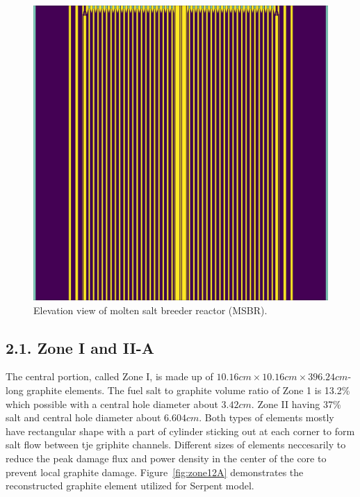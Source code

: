 \documentclass{anstrans}
\begin{document}
\begin{figure}[ht] %
  \centering
  \includegraphics[width=\linewidth]{figure_2_2.png}
  \caption{Elevation view of molten salt breeder reactor (MSBR).}
  \label{fig:elevation}
\end{figure}

\subsection{2.1. Zone I and II-A}
The central portion, called Zone I, is made up of $10.16cm\times10.16cm\times396.24cm$-long graphite elements. The fuel salt to graphite volume ratio of Zone 1 is 13.2\% which possible with a central hole diameter about $3.42cm$. Zone II having 37\% salt and central hole diameter about $6.604cm$. Both types of elements mostly have rectangular shape with a part of cylinder sticking out at each corner to form salt flow between tje griphite channels. Different sizes of elements neccesarily to reduce the peak damage flux and power density in the center of the core to prevent local graphite damage. Figure~\ref{fig:zone12A} demonstrates the reconstructed graphite element utilized for Serpent model.
\end{document}
